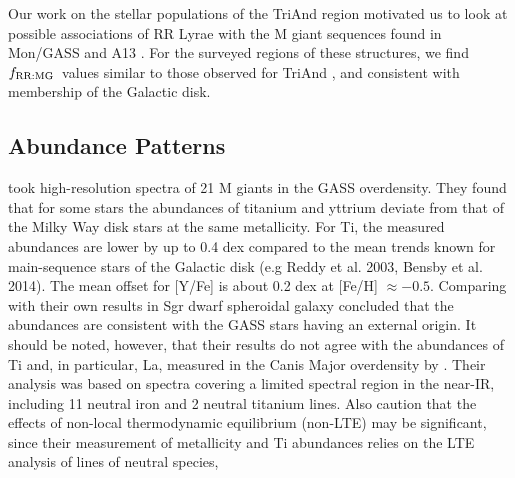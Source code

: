 \documentclass[galaxies,article,submit,moreauthors,pdftex,10pt,a4paper]{mdpi}
\newcommand{\frrmg}{\ensuremath{f_{\rm RR:MG}}}
\begin{document}
Our work on the stellar populations of the TriAnd region motivated us to look at possible associations of RR Lyrae with the M giant sequences found in Mon/GASS and A13 \citep{sheffield17}.
For the surveyed regions of these structures, we find \frrmg\ values similar to those observed for TriAnd , and consistent with membership of the Galactic disk.


\subsection{Abundance Patterns}


\cite{chou2010b} took high-resolution spectra of 21 M giants in the GASS overdensity. They found that for some stars the abundances of titanium and yttrium deviate from that of the Milky Way disk stars at the same metallicity.  For Ti, the measured abundances are lower by up to 0.4 dex compared to the mean trends known for main-sequence stars of the Galactic disk (e.g Reddy et al. 2003, Bensby et al. 2014). The mean offset for [Y/Fe] is about 0.2 dex at [Fe/H] $\approx -0.5$. Comparing with their own results in Sgr dwarf spheroidal galaxy \citep{chou2010a} concluded that the abundances are consistent with the GASS stars having an external origin. It should be noted, however, that their results do not agree with the abundances of Ti and, in particular, La, measured in the Canis Major overdensity by \cite{sbordone2005}. Their analysis was based on spectra covering a limited spectral region in the near-IR, including 11 neutral iron and 2 neutral titanium lines. Also \cite{chou2010b} caution that the effects of non-local thermodynamic equilibrium (non-LTE) may be significant, since their measurement of metallicity and Ti abundances relies on the LTE analysis of lines of neutral species,
\end{document}
